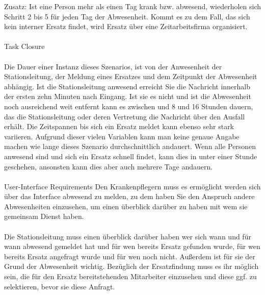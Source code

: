 \documentclass[11pt,
paper=a4,
bibtotocnumbered,	  %
liststotocnumbered,  %
DIV=calc,		  %
tablecaptionabove,	  %
headinclude,
]{article}
\begin{document}
Zusatz: Ist eine Person mehr als einen Tag krank bzw. abwesend, wiederholen sich Schritt 2 bis 5 für jeden Tag der Abwesenheit. Kommt es zu dem Fall, das sich kein interner Ersatz findet, wird Ersatz über eine Zeitarbeitsfirma organisiert.\\\\
Task Closure\\\\
Die Dauer einer Instanz dieses Szenarios, ist von der Anwesenheit der Stationsleitung, der Meldung eines Ersatzes und dem Zeitpunkt der Abwesenheit abhängig. Ist die Stationsleitung anwesend erreicht Sie die Nachricht innerhalb der ersten zehn Minuten nach Eingang. Ist sie es nicht und ist die Abwesenheit noch ausreichend weit entfernt kann es zwischen und 8 und 16 Stunden dauern, das die Stationsleitung oder deren Vertretung die Nachricht über den Ausfall erhält. Die Zeitspannen bis sich ein Ersatz meldet kann ebenso sehr stark variieren. Aufgrund dieser vielen Variablen kann man keine genaue Angabe machen wie lange dieses Szenario durchschnittlich andauert. Wenn alle Personen anwesend sind und sich ein Ersatz schnell findet, kann dies in unter einer Stunde geschehen, ansonsten kann dies aber auch mehrere Tage andauern.\\\\
User-Interface Requirements 
Den Krankenpflegern muss es ermöglicht werden sich über das Interface abwesend zu melden, zu dem haben Sie den Anspruch andere Abwesenheiten einzusehen, um einen überblick darüber zu haben mit wem sie gemeinsam Dienst haben.\\\\
Die Stationsleitung muss einen überblick darüber haben wer sich wann und für wann abwesend gemeldet hat und für wen bereits Ersatz gefunden wurde, für wen bereits Ersatz angefragt wurde und für wen noch nicht. Außerdem ist für sie der Grund der Abwesenheit wichtig. Bezüglich der Ersatzfindung muss es ihr möglich sein, die für den Ersatz bereitstehenden Mitarbeiter einzusehen und diese ggf. zu selektieren, bevor sie diese Anfragt.\\\\
\end{document}
